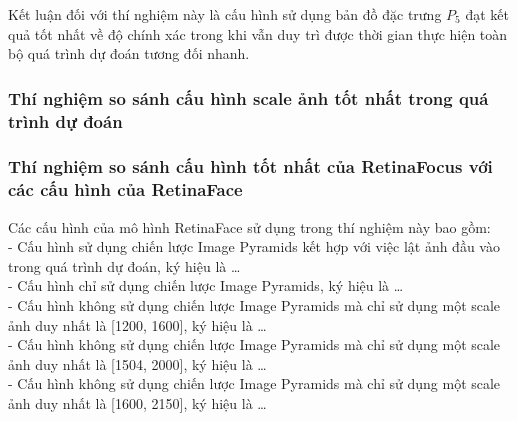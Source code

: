 {    \noindent
    Kết luận đối với thí nghiệm này là cấu hình sử dụng bản đồ đặc trưng ${P}_{5}$ đạt kết quả tốt nhất về độ chính xác trong khi vẫn duy trì được thời gian thực hiện toàn bộ quá trình dự đoán tương đối nhanh.

    \subsubsection*{Thí nghiệm so sánh cấu hình scale ảnh tốt nhất trong quá trình dự đoán}

    \subsubsection*{Thí nghiệm so sánh cấu hình tốt nhất của RetinaFocus với các cấu hình của RetinaFace}
    Các cấu hình của mô hình RetinaFace sử dụng trong thí nghiệm này bao gồm: \\
    - Cấu hình sử dụng chiến lược Image Pyramids kết hợp với việc lật ảnh đầu vào trong quá trình dự đoán, ký hiệu là \dots \\
    - Cấu hình chỉ sử dụng chiến lược Image Pyramids, ký hiệu là \dots \\
    - Cấu hình không sử dụng chiến lược Image Pyramids mà chỉ sử dụng một scale ảnh duy nhất là [1200, 1600], ký hiệu là \dots \\
    - Cấu hình không sử dụng chiến lược Image Pyramids mà chỉ sử dụng một scale ảnh duy nhất là [1504, 2000], ký hiệu là \dots \\
    - Cấu hình không sử dụng chiến lược Image Pyramids mà chỉ sử dụng một scale ảnh duy nhất là [1600, 2150], ký hiệu là \dots \\

}
